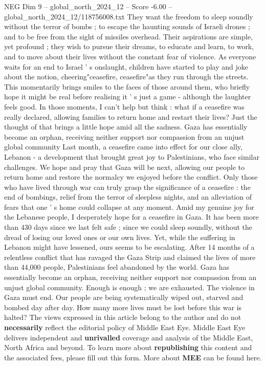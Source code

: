 \begin{textsample}{NEG Dim 9 – global\_north\_2024\_12 – Score -6.00 – global\_north\_2024\_12/118756008.txt}
They want the freedom to sleep soundly without the terror of bombs ; to escape the haunting sounds of Israeli drones ; and to be free from the sight of missiles overhead.
Their aspirations are simple, yet profound ; they wish to pursue their dreams, to educate and learn, to work, and to move about their lives without the constant fear of violence.
As everyone waits for an end to Israel ' s onslaught, children have started to play and joke about the notion, cheering"ceasefire, ceasefire"as they run through the streets.
This momentarily brings smiles to the faces of those around them, who briefly hope it might be real before realising it ' s just a game - although the laughter feels good.
In those moments, I can't help but think : what if a ceasefire was really declared, allowing families to return home and restart their lives?
Just the thought of that brings a little hope amid all the sadness.
Gaza has essentially become an orphan, receiving neither support nor compassion from an unjust global community Last month, a ceasefire came into effect for our close ally, Lebanon - a development that brought great joy to Palestinians, who face similar challenges.
We hope and pray that Gaza will be next, allowing our people to return home and restore the normalcy we enjoyed before the conflict.
Only those who have lived through war can truly grasp the significance of a ceasefire : the end of bombings, relief from the terror of sleepless nights, and an alleviation of fears that one ' s home could collapse at any moment.
Amid my genuine joy for the Lebanese people, I desperately hope for a ceasefire in Gaza.
It has been more than 430 days since we last felt safe ; since we could sleep soundly, without the dread of losing our loved ones or our own lives.
Yet, while the suffering in Lebanon might have lessened, ours seems to be escalating.
After 14 months of a relentless conflict that has ravaged the Gaza Strip and claimed the lives of more than 44,000 people, Palestinians feel abandoned by the world.
Gaza has essentially become an orphan, receiving neither support nor compassion from an unjust global community.
Enough is enough ; we are exhausted.
The violence in Gaza must end.
Our people are being systematically wiped out, starved and bombed day after day.
How many more lives must be lost before this war is halted?
The views expressed in this article belong to the author and do not \textbf{necessarily} reflect the editorial policy of Middle East Eye.
Middle East Eye delivers independent and \textbf{unrivalled} coverage and analysis of the Middle East, North Africa and beyond.
To learn more about \textbf{republishing} this content and the associated fees, please fill out this form.
More about \textbf{MEE} can be found here.

\end{textsample}
